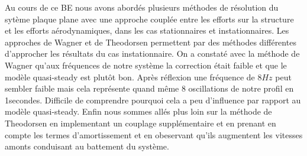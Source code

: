 \documentclass[conference]{IEEEtran}
\begin{document}
Au cours de ce BE nous avons abordés plusieurs méthodes de résolution du sytème plaque plane avec une approche couplée entre les efforts sur la structure et les efforts aérodynamiques, dans les cas stationnaires et instationnaires. 
\newline
Les approches de Wagner et de Theodorsen permettent par des méthodes différentes d'approcher les résultats du cas instationnaire. On a constaté avec la méthode de Wagner qu'aux fréquences de notre système la correction était faible et que le modèle quasi-steady est plutôt bon. Après réflexion une fréquence de $8Hz$ peut sembler faible mais cela représente quand même 8 oscillations de notre profil en 1secondes. Difficile de comprendre pourquoi cela a peu d'influence par rapport au modèle quasi-steady.
\newline
Enfin nous sommes allés plus loin sur la méthode de Theodorsen en implementant un couplage supplémentaire et en prenant en compte les termes d'amortissement et en obeservant qu'ils augmentent les vitesses amonts conduisant au battement du système. 
\end{document}
